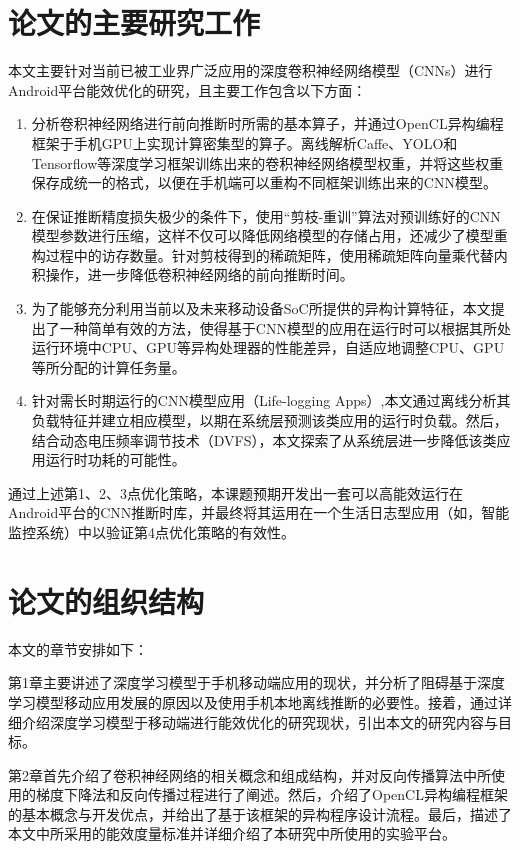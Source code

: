 \section{论文的主要研究工作}
本文主要针对当前已被工业界广泛应用的深度卷积神经网络模型（CNNs）进行Android平台能效优化的研究，且主要工作包含以下方面：
\begin{enumerate}
\item 分析卷积神经网络进行前向推断时所需的基本算子，并通过OpenCL异构编程框架于手机GPU上实现计算密集型的算子。离线解析Caffe、YOLO\cite{redmon2016you}和Tensorflow\cite{abadi2016tensorflow}等深度学习框架训练出来的卷积神经网络模型权重，并将这些权重保存成统一的格式，以便在手机端可以重构不同框架训练出来的CNN模型。
\item 在保证推断精度损失极少的条件下，使用“剪枝-重训”算法对预训练好的CNN模型参数进行压缩，这样不仅可以降低网络模型的存储占用，还减少了模型重构过程中的访存数量。针对剪枝得到的稀疏矩阵，使用稀疏矩阵向量乘代替内积操作，进一步降低卷积神经网络的前向推断时间。
\item 为了能够充分利用当前以及未来移动设备SoC所提供的异构计算特征，本文提出了一种简单有效的方法，使得基于CNN模型的应用在运行时可以根据其所处运行环境中CPU、GPU等异构处理器的性能差异，自适应地调整CPU、GPU等所分配的计算任务量。
\item 针对需长时期运行的CNN模型应用（Life-logging Apps）,本文通过离线分析其负载特征并建立相应模型，以期在系统层预测该类应用的运行时负载。然后，结合动态电压频率调节技术（DVFS），本文探索了从系统层进一步降低该类应用运行时功耗的可能性。
\end{enumerate}

通过上述第1、2、3点优化策略，本课题预期开发出一套可以高能效运行在Android平台的CNN推断时库，并最终将其运用在一个生活日志型应用（如，智能监控系统）中以验证第4点优化策略的有效性。

\section{论文的组织结构}

本文的章节安排如下：

第1章主要讲述了深度学习模型于手机移动端应用的现状，并分析了阻碍基于深度学习模型移动应用发展的原因以及使用手机本地离线推断的必要性。接着，通过详细介绍深度学习模型于移动端进行能效优化的研究现状，引出本文的研究内容与目标。

第2章首先介绍了卷积神经网络的相关概念和组成结构，并对反向传播算法中所使用的梯度下降法和反向传播过程进行了阐述。然后，介绍了OpenCL异构编程框架的基本概念与开发优点，并给出了基于该框架的异构程序设计流程。最后，描述了本文中所采用的能效度量标准并详细介绍了本研究中所使用的实验平台。

